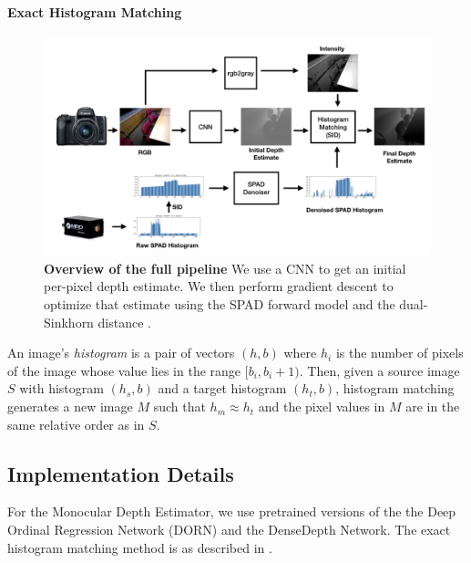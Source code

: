 \paragraph{Exact Histogram Matching}
\begin{figure}
  \includegraphics[width=\textwidth/2]{sections/figures/full_pipeline/full_pipeline.jpeg}
  \caption{\textbf{Overview of the full pipeline} We use a CNN to get an initial
  per-pixel depth estimate. We then perform gradient descent to optimize that
  estimate using the SPAD forward model and the dual-Sinkhorn distance
  .}
\end{figure}
An image's \textit{histogram} is a pair of vectors $(h, b)$ where $h_i$ is the number of
pixels of the image whose value lies in the range $[b_i, b_i+1)$.
Then, given a source image $S$ with histogram $(h_s, b)$ and a target histogram
$(h_t, b)$, histogram matching generates a new image $M$ such that $h_m \approx
h_t$ and the pixel values in $M$ are in the same relative order as in $S$.


\subsection{Implementation Details}
For the Monocular Depth Estimator, we use pretrained versions of the
the Deep Ordinal Regression Network (DORN) \cite{} and the DenseDepth Network.
The exact histogram matching method is as described in \cite{}.



